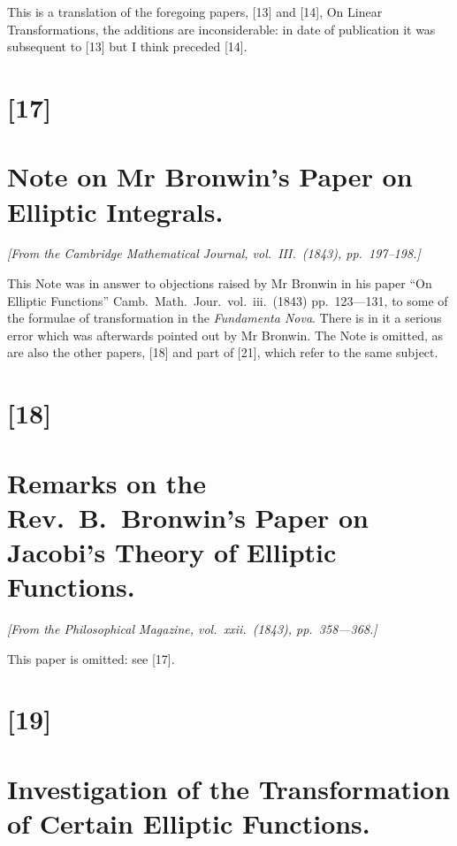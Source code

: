 \documentclass[12pt,a4paper]{article}
\begin{document}
\bigskip
\setcounter{page}{117}

This is a translation of the foregoing papers, [13] and [14], On Linear Transformations, the additions
are inconsiderable: in date of publication it was subsequent to [13] but I think preceded [14].

\newpage
\section*{[17]}
\section*{Note on Mr Bronwin's Paper on Elliptic Integrals.}

\textit{[From the Cambridge Mathematical Journal, vol.~III.~(1843), pp.~197--198.]}

\bigskip
\setcounter{page}{118}

This Note was in answer to objections raised by Mr Bronwin in his paper ``On Elliptic Functions''
Camb.\ Math.\ Jour.\ vol.~iii.\ (1843) pp.~123---131, to some of the formulae of transformation in the
\textit{Fundamenta Nova}. There is in it a serious error which was afterwards pointed out by Mr Bronwin.
The Note is omitted, as are also the other papers, [18] and part of [21], which refer to the same subject.

\newpage
\section*{[18]}
\section*{Remarks on the Rev.~B.~Bronwin's Paper on Jacobi's Theory of Elliptic Functions.}

\textit{[From the Philosophical Magazine, vol.~xxii.~(1843), pp.~358---368.]}

\bigskip
\setcounter{page}{119}

This paper is omitted: see [17].

\newpage
\section*{[19]}
\section*{Investigation of the Transformation of Certain Elliptic Functions.}
\end{document}
